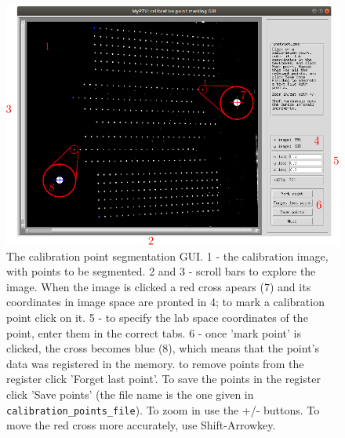 \documentclass[10pt,a4paper]{article}
\begin{document}
\begin{figure}[!ht]
	\centering
	\includegraphics[width=\textwidth]{Cal_point_GUI.pdf}
	\caption{The calibration point segmentation GUI. 1 - the calibration image, with points to be segmented. 2 and 3 - scroll bars to explore the image. When the image is clicked a red cross apears (7) and its coordinates in image space are pronted in 4; to mark a calibration point click on it. 5 - to specify the lab space coordinates of the point, enter them in the correct tabs. 6 - once 'mark point' is clicked, the cross becomes blue (8), which means that the point's data was registered in the memory. to remove points from the register click 'Forget last point'. To save the points in the register click 'Save points' (the file name is the one given in \texttt{calibration\_points\_file}). To zoom in use the +/- buttons. To move the red cross more accurately, use Shift-Arrowkey. \label{fig:Cal_point_GUI}}
\end{figure}
\end{document}
